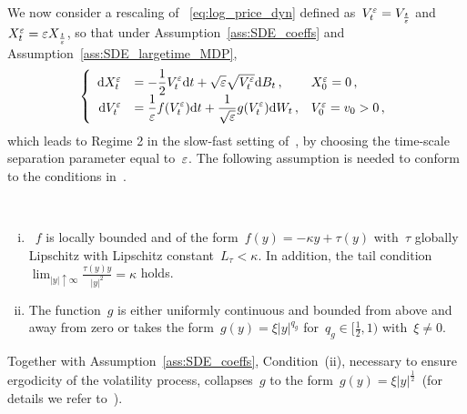 We now consider a rescaling of ~\eqref{eq:log_price_dyn}
defined as~$V_t^\varepsilon = V_{\frac{t}{\varepsilon}}$ and~$X_t^\varepsilon = \varepsilon X_{\frac{t}{\varepsilon}}$, so that under Assumption~\ref{ass:SDE_coeffs} and Assumption~\ref{ass:SDE_largetime_MDP},
\begin{equation}\label{eq:large_time_MD_dynamics}
\left\{
\begin{array}{rll}
\mathrm{d} X^\varepsilon_t &= \displaystyle -\frac{1}{2}V_t^\varepsilon \mathrm{d} t + \sqrt{\varepsilon}\sqrt{V_t^\varepsilon}\mathrm{d} B_t\,, 
& X_0^\varepsilon = 0\,, \\
\mathrm{d} V_t^\varepsilon &= \displaystyle \frac{1}{\varepsilon}f(V_t^\varepsilon)\mathrm{d} t + \frac{1}{\sqrt{\varepsilon}}g(V_t^\varepsilon)\mathrm{d} W_t\,, 
& V_0^\varepsilon = v_0>0\,,
\end{array}
\right.\end{equation}
which leads to Regime 2 in the slow-fast setting of~\cite[Theorem 2.1]{Morse2017ModerateDiffusions}, 
by choosing the time-scale separation parameter equal to~$\varepsilon$. The following assumption is needed to conform to the conditions in~\cite{Morse2017ModerateDiffusions}.
\begin{assumption}\label{ass:SDE_largetime_MDP}\
\begin{enumerate}[(i)]
    \item~$f$ is locally bounded and of the form~$f(y) = -\kappa y +\tau(y)$ with~$\tau$ globally Lipschitz with Lipschitz constant~$L_{\tau}<\kappa$. In addition, the tail condition~${\lim_{|y| \uparrow\infty}\frac{\tau(y)y}{|y|^2} = \kappa}$ holds.
    \item The function~$g$ is either uniformly continuous and bounded from above and away from zero or takes the form~$g(y) = \xi |y|^{q_g}$ for~$q_g \in [\frac{1}{2},1)$ with~$\xi\ne 0$.
\end{enumerate}
\end{assumption}
\begin{remark}
Together with Assumption~\ref{ass:SDE_coeffs}, 
Condition~(ii), necessary to ensure ergodicity of the volatility process, collapses~$g$ to the form~$g(y)=\xi |y|^\frac{1}{2}\,$ (for details we refer to~\cite{Jacquier2019PathwisePricing,Morse2017ModerateDiffusions}).
\end{remark}

